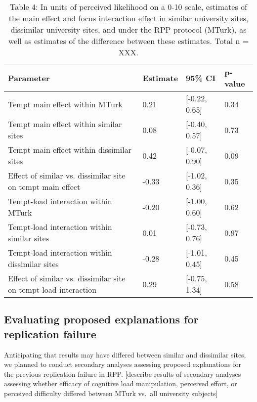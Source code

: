 \documentclass[english,floatsintext,man]{apa6}
\theoremstyle{definition}
\theoremstyle{definition}
\theoremstyle{definition}
\theoremstyle{remark}
\begin{document}
\begin{table}[tbp]
\begin{center}
\begin{threeparttable}
\caption{\label{tab:unnamed-chunk-3}Table 4: In units of perceived likelihood on a 0-10 scale, estimates of the main effect and focus interaction effect in similar university sites, dissimilar university sites, and under the RPP protocol (MTurk), as well as estimates of the difference between these estimates. Total n = XXX.}
\begin{tabular}{llll}
\toprule
Parameter & Estimate & 95\% CI & p-value\\
\midrule
Tempt main effect within MTurk & 0.21 & [-0.22, 0.65] & 0.34\\
Tempt main effect within similar sites & 0.08 & [-0.40, 0.57] & 0.73\\
Tempt main effect within dissimilar sites & 0.42 & [-0.07, 0.90] & 0.09\\
Effect of similar vs. dissimilar site on tempt main effect & -0.33 & [-1.02, 0.36] & 0.35\\
Tempt-load interaction within MTurk & -0.20 & [-1.00, 0.60] & 0.62\\
Tempt-load interaction within similar sites & 0.01 & [-0.73, 0.76] & 0.97\\
Tempt-load interaction within dissimilar sites & -0.28 & [-1.01, 0.45] & 0.45\\
Effect of similar vs. dissimilar site on tempt-load interaction & 0.29 & [-0.75, 1.34] & 0.58\\
\bottomrule
\end{tabular}
\end{threeparttable}
\end{center}
\end{table}

\subsection{Evaluating proposed explanations for replication
failure}\label{evaluating-proposed-explanations-for-replication-failure}

Anticipating that results may have differed between similar and
dissimilar sites, we planned to conduct secondary analyses assessing
proposed explanations for the previous replication failure in RPP.
{[}describe results of secondary analyses assessing whether efficacy of
cognitive load manipulation, perceived effort, or perceived difficulty
differed between MTurk vs.~all university subjects{]}
\end{document}
